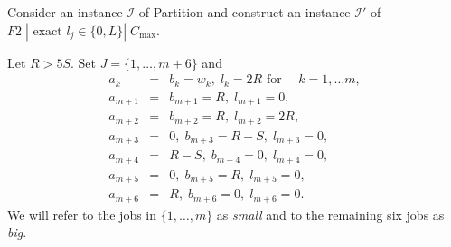\documentclass[12pt,a4paper]{article}
\begin{document}
Consider an instance $\mathcal{I}$ of {\sc Partition} and construct
an instance $\mathcal{I}'$ of $F2\;|\mbox{ exact }l_j\in
\{0,L\}|\;C_{\max}$.

Let $R>5 S$. Set $J=\{1,\ldots ,m+6\}$ and
\begin{eqnarray*}
   a_k&=&b_k=w_k, \; l_k=2R \mbox{ for } \quad k=1,\ldots m, \\
   a_{m+1} &=& b_{m+1}=R,\; l_{m+1}=0, \\
   a_{m+2} &=& b_{m+2}=R, \; l_{m+2}=2R, \\
   a_{m+3} &=& 0, \; b_{m+3}=R-S, \; l_{m+3}=0, \\
   a_{m+4} &=& R-S, \; b_{m+4}=0,\; l_{m+4}=0,\\
  a_{m+5} &=& 0, \; b_{m+5}=R, \;  l_{m+5}=0, \\
  a_{m+6} &=& R,\; b_{m+6}=0,\;  l_{m+6}=0.
\end{eqnarray*}
We will refer to the jobs in $\{1,\ldots, m\}$ as \emph{small} and
to the remaining six jobs as \emph{big}.
\end{document}
